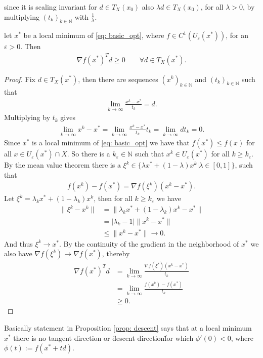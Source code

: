 since it is scaling invariant for $d \in T_X(x_0)$ also $\lambda d \in
T_X(x_0)$, for all $\lambda > 0$, by multiplying $(t_k)_{k \in \mathbb{N} }$
with $\frac{1}{\lambda}$.
\begin{proposition}
    \label{prop: descent}
    let $x^{*}$ be a local minimum of \ref{eq: basic_opt}, where $f \in
    C^1(U_{\varepsilon}(x^{*}))$, for an $\varepsilon >0$. Then
    \begin{align}
        \nabla f(x^{*})^{T}d \ge 0 \qquad \forall d \in T_X(x^{*}).
    \end{align}
\end{proposition}
\begin{proof}
Fix $d \in T_X(x^{*})$, then there are sequences $(x^{k})_{k \in \mathbb{N} }$
and $(t_k)_{k \in \mathbb{N}}$ such that
\begin{align}
    \lim_{k \to \infty} \frac{x^{k}-x^{*}}{t_k} = d.
\end{align}
Multiplying by $t_k$ gives
\begin{align}
   \lim_{k \to \infty} x^{k} - x^{*} =
   \lim_{k \to \infty}  \frac{x^{k}-x^{*}  }{t_k}t_k =
   \lim_{k \to \infty} dt_k = 0.
\end{align}
Since $x^{*}$ is a local minimum of \ref{eq: basic_opt} we have that
$f(x^{*}) \le f(x)$ for all $x \in U_\varepsilon(x^{*}) \cap X$. So there is
a $k_\varepsilon \in \mathbb{N}$ such that $x^{k} \in U_\varepsilon(x^{*})$
for all $k\ge k_\varepsilon$. By the mean value theorem there is a $\xi^{k}
\in \{\lambda x^{*} + (1-\lambda)x^{k}| \lambda \in [0, 1]  \} $, such that
\begin{align}
    f(x^{k}) - f(x^{*} ) = \nabla f(\xi^{k} )(x^{k} -x^{*} ).
\end{align}
Let $\xi^{k} = \lambda_k x^{*} + (1-\lambda_k)x^{k}$, then for all $k \ge
k_\varepsilon$ we have
\begin{align}
    \|\xi^{k} -x^{k} \| &= \|\lambda_k x^{*} + (1-\lambda_k) x^{k}
    -x^{*}\| \\
                &=|\lambda_k-1| \| x^{k}  - x^{*} \|\\
                &\le \| x^{k}  - x^{*} \| \to 0.
\end{align}
And thus $\xi^{k} \to x^{*}$. By the continuity of the gradient in the
neighborhood of $x^{*}$ we also have $\nabla f(\xi^{k}) \to \nabla f(x^{*})$,
thereby
\begin{align}
    \nabla f(x^{*})^{T} d &= \lim_{k \to \infty} \frac{\nabla f(\xi^{*})
    (x^{k}-x^{*})}{t_k} \\
              &=\lim_{k \to \infty} \frac{f(x^{k}) - f(x^{*})  }{t_{k} } \\
              &\ge 0.
\end{align}
\end{proof}
Basically statement in Proposition \ref{prop: descent} says that at a local
minimum $x^{*}$ there is no tangent direction or \"descent direction\" for
which $\phi '(0) < 0$, where $\phi(t) := f(x^{*} + t d)$.

